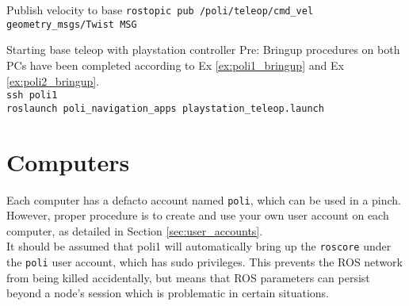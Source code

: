\begin{example}{Publish velocity to base}
  \label{ex:base_velocity}
    \texttt{rostopic pub /poli/teleop/cmd\_vel geometry\_msgs/Twist MSG}\\
\end{example}

\begin{example}{Starting base teleop with playstation controller}
  \label{ex:base_teleop}
    Pre: Bringup procedures on both PCs have been completed according to Ex \ref{ex:poli1_bringup} and Ex \ref{ex:poli2_bringup}. \\
    \texttt{ssh poli1} \\ 
    \texttt{roslaunch poli\_navigation\_apps playstation\_teleop.launch} \\

\end{example}


\section{Computers}
Each computer has a defacto account named \texttt{poli}, which can be used in a pinch. 
However, proper procedure is to create and use your own user account on each computer, as detailed in Section \ref{sec:user_accounts}. \\

It should be assumed that poli1 will automatically bring up the \texttt{roscore} under the \texttt{poli} user account, which has sudo privileges. 
This prevents the ROS network from being killed accidentally, but means that ROS parameters can persist beyond a node's session which is problematic in certain situations. \\


